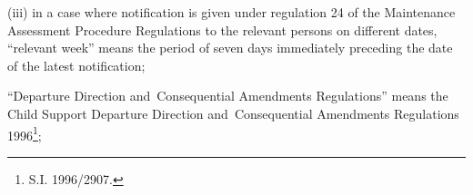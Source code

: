 \documentclass[12pt,a4paper]{article}
\begin{document}
\begin{enumerate}
\begin{enumerate}
%

(iii) in a case where notification is given under regulation 24 of the Maintenance Assessment Procedure Regulations to the relevant persons on different dates, “relevant week” means the period of seven days immediately preceding the date of the latest notification;
\end{enumerate}


\begin{sloppypar}
“Departure Direction and~Consequential Amendments Regulations” means the Child Support Departure Direction and~Consequential Amendments Regulations 1996\footnote{\frenchspacing S.I. 1996/2907.};
\end{sloppypar}




\end{enumerate}
\end{document}
